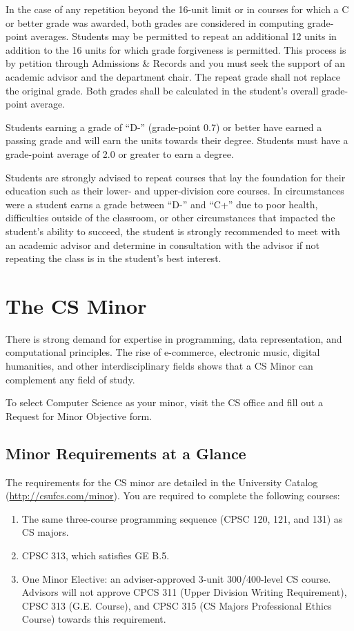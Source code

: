\documentclass{book}
\newcommand{\shrunkurl}[1]{\url{http://csufcs.com/#1}}
\begin{document}
In the case of any repetition beyond the 16-unit limit or in courses for which a C or better grade was awarded, both grades are considered in computing grade-point averages. Students may be permitted to repeat an additional 12 units in addition to the 16 units for which grade forgiveness is permitted. This process is by petition through Admissions \& Records and you must seek the support of an academic advisor and the department chair. The repeat grade shall not replace the original grade. Both grades shall be calculated in the student’s overall grade-point average.

Students earning a grade of ``D-'' (grade-point 0.7) or better have earned a passing grade and will earn the units towards their degree. Students must have a grade-point average of 2.0 or greater to earn a degree.

Students are strongly advised to repeat courses that lay the foundation for their education such as their lower- and upper-division core courses. In circumstances were a student earns a grade between ``D-'' and ``C+'' due to poor health, difficulties outside of the classroom, or other circumstances that impacted the student's ability to succeed, the student is strongly recommended to meet with an academic advisor and determine in consultation with the advisor if not repeating the class is in the student's best interest.


\chapter{The CS Minor}

There is strong demand for expertise in programming, data representation, and computational principles. The rise of e-commerce, electronic music, digital humanities, and other interdisciplinary fields shows that a CS Minor can complement any field of study.

To select Computer Science as your minor, visit the CS office and fill out a Request for Minor Objective form.

\section{Minor Requirements at a Glance}
The requirements for the CS minor are detailed in the University Catalog (\shrunkurl{minor}). You are required to complete the following courses:
\begin{enumerate}
  \item The same three-course programming sequence (CPSC 120, 121, and 131) as CS majors.
  \item CPSC 313, which satisfies GE B.5.
  \item One Minor Elective: an adviser-approved 3-unit 300/400-level CS course. Advisors will not approve CPCS 311 (Upper Division Writing Requirement), CPSC 313 (G.E. Course), and CPSC 315 (CS Majors Professional Ethics Course) towards this requirement.
\end{enumerate}
\end{document}
